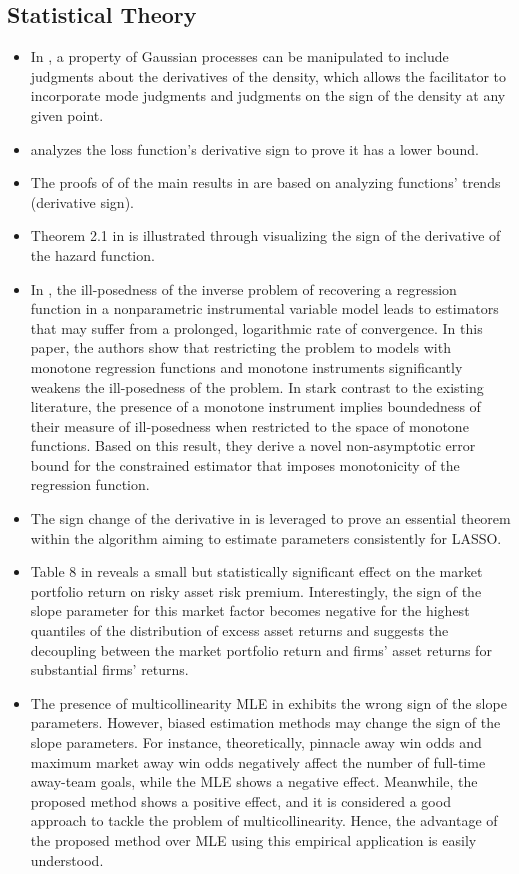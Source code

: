 \documentclass[11pt]{book}
\begin{document}
\subsection{Statistical Theory}
\begin{itemize}
\item In \cite{gosling2007nonparametric},
a property of Gaussian processes can be manipulated to include judgments
about the derivatives of the density, which allows the facilitator
to incorporate mode judgments and judgments on the sign of the density
at any given point.
\item \cite{carobbi2008absolute}
analyzes the loss function's derivative sign to prove it has a lower
bound.
\item The proofs of of the main results in \cite{bebbington2012discrete}
are based on analyzing functions' trends (derivative sign).
\item Theorem 2.1 in \cite{qian2012fisher}
is illustrated through visualizing the sign of the derivative of the
hazard function.
\item In \cite{chetverikov2017nonparametric},
the ill-posedness of the inverse problem of recovering a regression
function in a nonparametric instrumental variable model leads to estimators
that may suffer from a prolonged, logarithmic rate of convergence.
In this paper, the authors show that restricting the problem to models
with monotone regression functions and monotone instruments significantly
weakens the ill-posedness of the problem. In stark contrast to the
existing literature, the presence of a monotone instrument implies
boundedness of their measure of ill-posedness when restricted to the
space of monotone functions. Based on this result, they derive a novel
non-asymptotic error bound for the constrained estimator that imposes
monotonicity of the regression function.
\item The sign change of the derivative in \cite{mousavi2018consistent}
is leveraged to prove an essential theorem within the algorithm aiming
to estimate parameters consistently for LASSO.
\item Table 8 in \cite{galvao2018testing}
reveals a small but statistically significant effect on the market
portfolio return on risky asset risk premium. Interestingly, the sign
of the slope parameter for this market factor becomes negative for
the highest quantiles of the distribution of excess asset returns
and suggests the decoupling between the market portfolio return and
firms' asset returns for substantial firms' returns.
\item The presence of multicollinearity MLE in \cite{qasim2020biased}
exhibits the wrong sign of the slope parameters. However, biased estimation
methods may change the sign of the slope parameters. For instance,
theoretically, pinnacle away win odds and maximum market away win
odds negatively affect the number of full-time away-team goals, while
the MLE shows a negative effect. Meanwhile, the proposed method shows
a positive effect, and it is considered a good approach to tackle
the problem of multicollinearity. Hence, the advantage of the proposed
method over MLE using this empirical application is easily understood.
\end{itemize}
\end{document}
